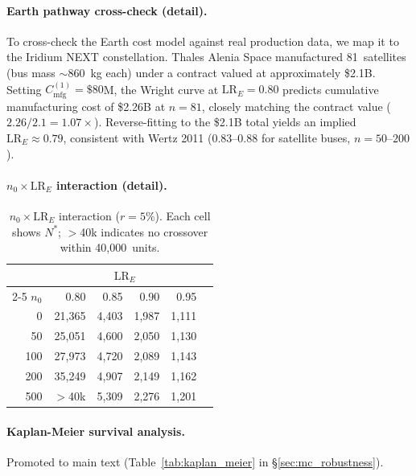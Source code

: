 \documentclass[preprint,12pt]{elsarticle}
\begin{document}
\paragraph{Earth pathway cross-check (detail).} To cross-check the Earth cost model against real production data, we map it to the Iridium NEXT constellation. Thales Alenia Space manufactured 81~satellites (bus mass $\sim$860~kg each) under a contract valued at approximately \$2.1B. Setting $C_{\mathrm{mfg}}^{(1)} = \$80$M, the Wright curve at $\mathrm{LR}_E = 0.80$ predicts cumulative manufacturing cost of \$2.26B at $n = 81$, closely matching the contract value ($2.26/2.1 = 1.07\times$). Reverse-fitting to the \$2.1B total yields an implied $\mathrm{LR}_E \approx 0.79$, consistent with Wertz 2011 \cite{wertz2011} (0.83--0.88 for satellite buses, $n = 50$--$200$).

\paragraph{$n_0 \times \mathrm{LR}_E$ interaction (detail).}

\begin{table}[htbp]
\centering
\caption{$n_0 \times \mathrm{LR}_E$ interaction ($r = 5\%$). Each cell shows $N^*$; $>$40k indicates no crossover within 40{,}000~units.}
\label{tab:n0_lr_interaction}
\small
\begin{tabular}{@{}rrrrrr@{}}
\toprule
 & \multicolumn{4}{c}{$\mathrm{LR}_E$} \\
\cmidrule(l){2-5}
$n_0$ & 0.80 & 0.85 & 0.90 & 0.95 \\
\midrule
0   & 21{,}365 & 4{,}403 & 1{,}987 & 1{,}111 \\
50  & 25{,}051 & 4{,}600 & 2{,}050 & 1{,}130 \\
100 & 27{,}973 & 4{,}720 & 2{,}089 & 1{,}143 \\
200 & 35{,}249 & 4{,}907 & 2{,}149 & 1{,}162 \\
500 & $>$40k   & 5{,}309 & 2{,}276 & 1{,}201 \\
\bottomrule
\end{tabular}
\end{table}

\paragraph{Kaplan-Meier survival analysis.} Promoted to main text (Table~\ref{tab:kaplan_meier} in \S\ref{sec:mc_robustness}).
\end{document}
